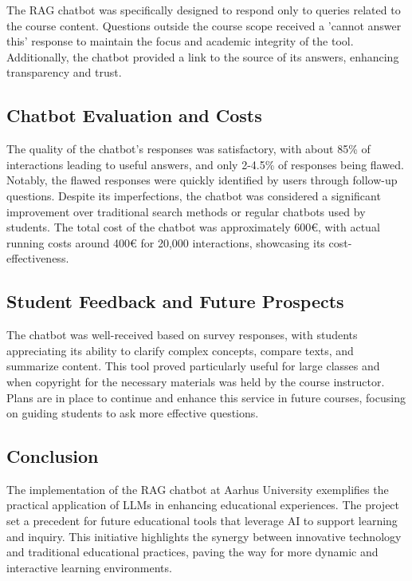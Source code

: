 The RAG chatbot was specifically designed to respond only to queries related to the course content. Questions outside the course scope received a 'cannot answer this' response to maintain the focus and academic integrity of the tool. Additionally, the chatbot provided a link to the source of its answers, enhancing transparency and trust.

\subsection*{Chatbot Evaluation and Costs}

The quality of the chatbot's responses was satisfactory, with about 85\% of interactions leading to useful answers, and only 2-4.5\% of responses being flawed. Notably, the flawed responses were quickly identified by users through follow-up questions. Despite its imperfections, the chatbot was considered a significant improvement over traditional search methods or regular chatbots used by students. The total cost of the chatbot was approximately 600€, with actual running costs around 400€ for 20,000 interactions, showcasing its cost-effectiveness.

\subsection*{Student Feedback and Future Prospects}

The chatbot was well-received based on survey responses, with students appreciating its ability to clarify complex concepts, compare texts, and summarize content. This tool proved particularly useful for large classes and when copyright for the necessary materials was held by the course instructor. Plans are in place to continue and enhance this service in future courses, focusing on guiding students to ask more effective questions.

\subsection*{Conclusion}

The implementation of the RAG chatbot at Aarhus University exemplifies the practical application of LLMs in enhancing educational experiences. The project set a precedent for future educational tools that leverage AI to support learning and inquiry. This initiative highlights the synergy between innovative technology and traditional educational practices, paving the way for more dynamic and interactive learning environments.